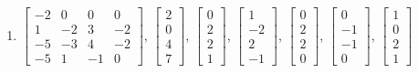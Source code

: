 \begin{exercise}
\begin{enumerate}
\item \(\begin{bmatrix} -2&0&0&0\\1&-2&3&-2\\-5&-3&4&-2\\-5&1&-1&0 \end{bmatrix}\),\quad
\(\begin{bmatrix}2\\0\\4\\7\end{bmatrix}\), \(\begin{bmatrix}0\\2\\2\\1\end{bmatrix}\), \(\begin{bmatrix}1\\-2\\2\\-1\end{bmatrix}\), \(\begin{bmatrix}0\\2\\2\\0\end{bmatrix}\), \(\begin{bmatrix}0\\-1\\-1\\0\end{bmatrix}\), \(\begin{bmatrix}1\\0\\2\\1\end{bmatrix}\)


\end{enumerate}
\end{exercise}
